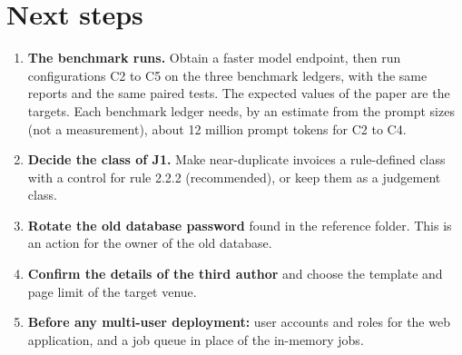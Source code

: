 \documentclass[11pt,a4paper]{article}
\begin{document}
\section{Next steps}
\begin{enumerate}
\item \textbf{The benchmark runs.} Obtain a faster model endpoint, then run configurations C2 to C5 on the three benchmark ledgers, with the same reports and the same paired tests. The expected values of the paper are the targets. Each benchmark ledger needs, by an estimate from the prompt sizes (not a measurement), about 12 million prompt tokens for C2 to C4.
\item \textbf{Decide the class of J1.} Make near-duplicate invoices a rule-defined class with a control for rule 2.2.2 (recommended), or keep them as a judgement class.
\item \textbf{Rotate the old database password} found in the reference folder. This is an action for the owner of the old database.
\item \textbf{Confirm the details of the third author} and choose the template and page limit of the target venue.
\item \textbf{Before any multi-user deployment:} user accounts and roles for the web application, and a job queue in place of the in-memory jobs.
\end{enumerate}

\appendix
\end{document}
